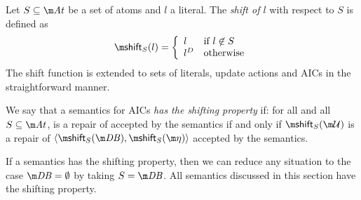 \begin{definition}
 Let $S\subseteq\atoms$ be a set of atoms and $l$ a literal. The \emph{shift of $l$} with respect to $S$ is defined as 
 \[\shift_S(l) = \left\{\begin{array}{ll}                                                                                                             l&\text{if $l\not\in S$}\\                                                                                                              l^D&\text{otherwise}                                                                                                                                      \end{array}\right.\]
 The shift function is extended to sets of literals, update actions and AICs in the straightforward manner. 
\end{definition}

\begin{definition}
 We say that a semantics for AICs \emph{has the shifting property} if: for all \fulldb and all $S\subseteq \atoms$, \UU is a repair of \fulldb accepted by the semantics if and only if $\shift_S(\UU)$ is a repair of $\langle\shift_S(\db),\shift_S(\aics)\rangle$ accepted by the semantics.
\end{definition}

If a semantics has the shifting property, then we can reduce any situation to the case $\db=\emptyset$ by taking $S=\db$.  All semantics discussed in this section have the shifting property. 

